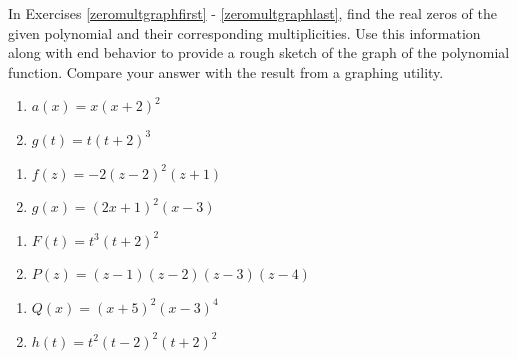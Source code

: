 \label{polygraphexercise}

In Exercises \ref{zeromultgraphfirst} - \ref{zeromultgraphlast}, find the real zeros of the given polynomial and their corresponding multiplicities.  Use this information along with end behavior to provide a rough sketch of the graph of the polynomial function.  Compare your answer with the result from a graphing utility.

\begin{multicols}{2}
\begin{enumerate}
\setcounter{enumi}{\value{HW}}

\item $a(x) = x(x + 2)^{2}$ \label{zeromultgraphfirst}
\item $g(t) = t(t + 2)^{3}$

\setcounter{HW}{\value{enumi}}
\end{enumerate}
\end{multicols}


\begin{multicols}{2}
\begin{enumerate}
\setcounter{enumi}{\value{HW}}

\item $f(z) = -2(z-2)^2(z+1)$
\item $g(x) = (2x+1)^2(x-3)$

\setcounter{HW}{\value{enumi}}
\end{enumerate}
\end{multicols}


\begin{multicols}{2}
\begin{enumerate}
\setcounter{enumi}{\value{HW}}

\item $F(t) = t^{3}(t+ 2)^{2}$
\item $P(z) = (z- 1)(z - 2)(z - 3)(z - 4)$

\setcounter{HW}{\value{enumi}}
\end{enumerate}
\end{multicols}


\begin{multicols}{2}
\begin{enumerate}
\setcounter{enumi}{\value{HW}}

\item $Q(x) = (x + 5)^{2}(x - 3)^{4}$
\item $h(t) = t^2(t-2)^2(t+2)^2$

\setcounter{HW}{\value{enumi}}
\end{enumerate}
\end{multicols}


